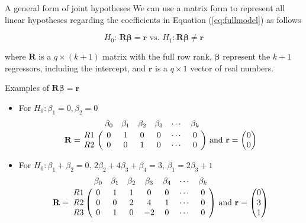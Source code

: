 \documentclass[presentation,10pt]{beamer}
\begin{document}
\begin{frame}[label={sec:org7aad802}]{A general form of joint hypotheses}
We can use a matrix form to represent all linear hypotheses regarding
the coefficients in Equation (\ref{eq:fullmodel}) as follows

\begin{equation}
\label{eq:jnt-hyp-g}
H_0:\, \mathbf{R}\boldsymbol{\beta} = \mathbf{r} \text{ vs. } H_1: \mathbf{R}\boldsymbol{\beta} \neq \mathbf{r}
\end{equation}

where \(\mathbf{R}\) is a \(q \times (k+1)\) matrix with the \alert{full row rank},
\(\boldsymbol{\beta}\) represent the \(k+1\) regressors, including
the intercept, and \(\mathbf{r}\) is a \(q \times 1\) vector of real
numbers.
\end{frame}

\begin{frame}[label={sec:org3a2b2d0}]{Examples of \(\mathbf{R}\boldsymbol{\beta} = \mathbf{r}\)}
\begin{itemize}
\item For \(H_0: \beta_1 = 0, \beta_2=0\)
\begin{equation*}
\mathbf{R} =
\bordermatrix{~ & \beta_0 & \beta_1 & \beta_2 & \beta_3 & \cdots & \beta_k \cr
R1 & 0 & 1 & 0 & 0 & \cdots & 0 \cr
R2 & 0 & 0 & 1 & 0 & \cdots & 0 \cr}
\text{ and }
\mathbf{r} =
\begin{pmatrix}
0 \\
0
\end{pmatrix}
\end{equation*}

\item For \(H_0: \beta_1 + \beta_2 = 0,\, 2\beta_2 + 4\beta_3 + \beta_4 =
  3,\, \beta_1 = 2 \beta_3 + 1\)
\begin{equation*}
\mathbf{R} =
\bordermatrix{~ & \beta_0 & \beta_1 & \beta_2 & \beta_3 & \beta_4 & \cdots & \beta_k \cr
R1 & 0 & 1 & 1 & 0 & 0 & \cdots & 0 \cr
R2 & 0 & 0 & 2 & 4 & 1 & \cdots & 0 \cr
R3 & 0 & 1 & 0 & -2 & 0 & \cdots & 0 \cr}
\text{ and }
\mathbf{r} =
\begin{pmatrix}
0 \\
3 \\
1
\end{pmatrix}
\end{equation*}
\end{itemize}
\end{frame}
\end{document}
